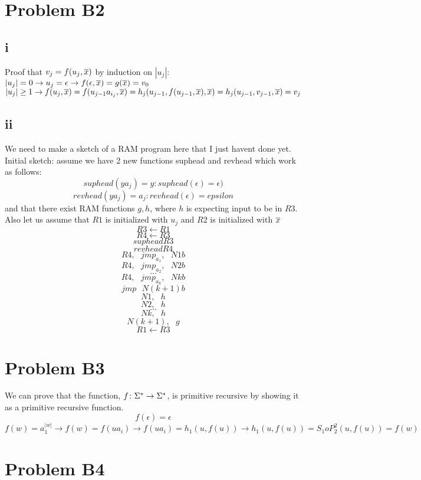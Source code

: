 \documentclass[12pt]{article}
\begin{document}
\section*{Problem B2}
\subsection*{i}
Proof that $v_j = f(u_j, \overline{x})$ by induction on $|u_j|$: \newline
$|u_j| = 0 \rightarrow u_j = \epsilon \rightarrow f(\epsilon, \overline{x}) = g(\overline{x}) = v_0$\newline
$|u_j| \ge 1 \rightarrow f(u_j, \overline{x}) = f(u_{j-1}a_{i_j}, \overline{x}) = h_j(u_{j-1}, f(u_{j-1}, \overline{x}), \overline{x}) = h_j(u_{j-1}, v_{j-1}, \overline{x}) = v_j$

\subsection*{ii}
We need to make a sketch of a RAM  program here that I just havent done yet. Initial sketch:\newline
assume we have 2 new functions suphead and revhead which work as follows: $$suphead(ya_j) = y : suphead(\epsilon) = \epsilon)$$ $$revhead(ya_j) = a_j : revhead(\epsilon) = epsilon$$ and that there exist RAM functions $g , h$, where $h$ is expecting input to be in $R3$.  Also let us assume that $R1$ is initialized with $u_j$ and $R2$ is initialized with $\overline{x}$
$$R3 \leftarrow R1$$
$$R4 \leftarrow R3$$
$$suphead R3$$
$$revhead R4$$
$$R4,  \text{ }  jmp_{a_1},  \text{ }  N1b$$
$$R4,  \text{ }  jmp_{a_2},  \text{ }  N2b$$
$$...$$
$$R4,  \text{ }  jmp_{a_k},  \text{ }  Nkb$$
$$jmp \text{ } N(k+1)b$$
$$N1,  \text{ } h$$
$$N2,  \text{ } h$$
$$...$$
$$Nk,  \text{ } h$$
$$N(k+1), \text{ }  g$$
$$R1 \leftarrow R3$$

\section*{Problem B3}
We can prove that the function, $f\colon \Sigma^*\rightarrow \Sigma^*$, is primitive recursive by showing it as a primitive recursive function. \newline
$$f(\epsilon) = \epsilon $$
$$f(w) = a_1^{|w|} \rightarrow f(w) = f(ua_i) \rightarrow f(ua_i) = h_1(u, f(u)) \rightarrow h_1(u, f(u))= S_1 o P^2_2(u, f(u)) = f(w)$$

\section*{Problem B4}
\end{document}

